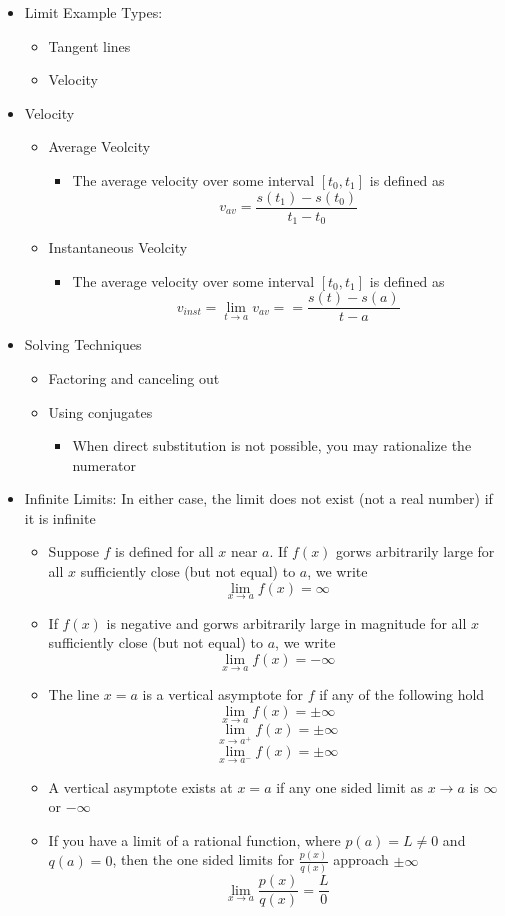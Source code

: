 \documentclass{article}
\begin{document}
\begin{itemize}
    \item Limit Example Types:
        \begin{itemize}
            \item Tangent lines
            \item Velocity
        \end{itemize}
    \item Velocity
        \begin{itemize}
            \item Average Veolcity
            \begin{itemize}
                \item The average velocity over some interval $[t_0, t_1]$ is defined as
                $$v_{av} = \frac{s(t_1) - s(t_0)}{t_1 - t_0}$$
            \end{itemize}
            \item Instantaneous Veolcity
            \begin{itemize}
                \item The average velocity over some interval $[t_0, t_1]$ is defined as
                $$v_{inst} = \lim_{t \to a}{v_{av}} = = \frac{s(t) - s(a)}{t - a}$$
            \end{itemize}
        \end{itemize}
    \item Solving Techniques
        \begin{itemize}
    	    \item Factoring and canceling out
    	    \item Using conjugates
            \begin{itemize}
    	    	\item When direct substitution is not possible, you may rationalize the numerator
            \end{itemize}
        \end{itemize}
	\item Infinite Limits: In either case, the limit does not exist (not a real number) if it is infinite
	\begin{itemize}
		\item Suppose $f$ is defined for all $x$ near $a$. If $f(x)$ gorws arbitrarily large for all $x$ sufficiently close (but not equal) to $a$, we write
		$$\lim_{x \to a}{f(x)} = \infty$$
		\item If $f(x)$ is negative and gorws arbitrarily large in magnitude for all $x$ sufficiently close (but not equal) to $a$, we write
		$$\lim_{x \to a}{f(x)} = - \infty$$
		\item The line $x = a$ is a vertical asymptote for $f$ if any of the following hold
		$$\lim_{x \to a}{f(x)} = \pm \infty$$
		$$\lim_{x \to a^+}{f(x)} = \pm \infty$$
		$$\lim_{x \to a^-}{f(x)} = \pm \infty$$
		\item A vertical asymptote exists at $x = a$ if any one sided limit as $x \to a$ is $\infty$ or $- \infty$
		\item If you have a limit of a rational function, where $p(a) = L \neq 0$ and $q(a) = 0$, then the one sided limits for $\frac{p(x)}{q(x)}$ approach $\pm \infty$
		$$\lim_{x \to a}{\frac{p(x)}{q(x)}} = \frac{L}{0}$$
	\end{itemize}
\end{itemize}
\end{document}
